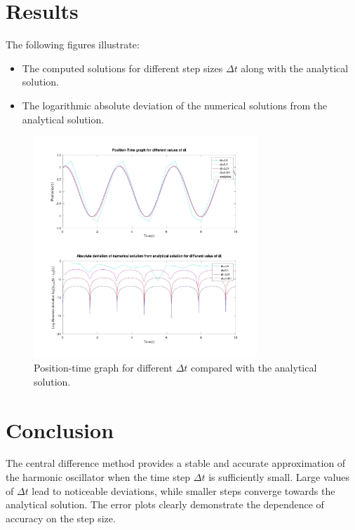 \section*{Results}
The following figures illustrate:
\begin{itemize}
    \item The computed solutions for different step sizes $\Delta t$ along with the analytical solution.
    \item The logarithmic absolute deviation of the numerical solutions from the analytical solution.
\end{itemize}

\begin{figure}[h!]
    \centering
    \includegraphics[width=0.75\textwidth]{a3.jpg}
    \caption{Position-time graph for different $\Delta t$ compared with the analytical solution.}
\end{figure}

\section*{Conclusion}
The central difference method provides a stable and accurate approximation of the harmonic oscillator when the time step $\Delta t$ is sufficiently small. Large values of $\Delta t$ lead to noticeable deviations, while smaller steps converge towards the analytical solution. The error plots clearly demonstrate the dependence of accuracy on the step size.
